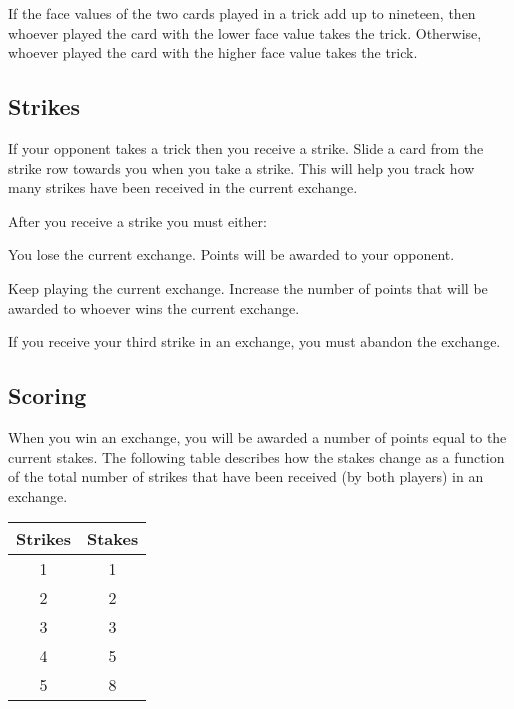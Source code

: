 \documentclass[a6paper, parskip=half, DIV=14, 10pt]{scrartcl}
\newcommand{\card}[1]{{\setmainfont{Roboto Slab} #1}}
\begin{document}
If the face values of the two cards played in a trick add up to nineteen, then whoever played the card with the lower face value takes the trick. Otherwise, whoever played the card with the higher face value takes the trick.

%

\newpage

\subsection*{Strikes}
If your opponent takes a trick then you receive a strike. Slide a card from the strike row towards you when you take a strike. This will help you track how many strikes have been received in the current exchange.


After you receive a strike you must either:
\begin{description}[leftmargin=0pt, labelsep=\widthof{\ }]
	\item[Abandon the Exchange \textendash] You lose the current exchange. Points will be awarded to your opponent.
	\item[Raise the Stakes \textendash] Keep playing the current exchange. Increase the number of points that will be awarded to whoever wins the current exchange.
\end{description}
If you receive your third strike in an exchange, you must abandon the exchange.

\newpage

\subsection*{Scoring}
When you win an exchange, you will be awarded a number of points equal to the current stakes. The following table describes how the stakes change as a function of the total number of strikes that have been received (by both players) in an exchange.

{
\setmainfont{Roboto Slab}
\begin{table}[h]
\centering
\begin{tabular}{cc} \toprule
\textbf{Strikes} & \textbf{Stakes} \\ \midrule
1 & 1\\
2 & 2\\
3 & 3\\
4 & 5\\
5 & 8 \\ \bottomrule
\end{tabular}
\end{table}
}
\end{document}

